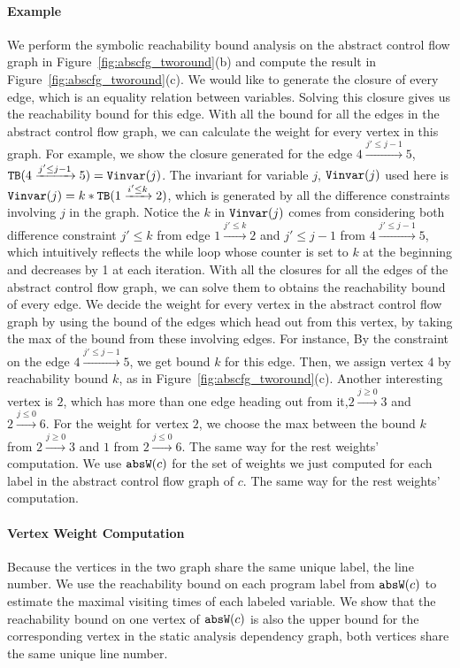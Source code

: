 \begin{enumerate}
\paragraph*{Example}
We perform the symbolic reachability bound analysis on the abstract control flow graph in Figure~\ref{fig:abscfg_tworound}(b) and compute the result in Figure~\ref{fig:abscfg_tworound}(c).
We would like to generate the closure of every edge, which is an equality relation between variables.  Solving this closure gives us the reachability bound for this edge. With all the bound for all the edges in the abstract control flow graph, we can calculate the weight for every vertex in this graph. For example, we show the closure generated for the edge 
$4 \xrightarrow{j' \leq j - 1} 5$, 
${\mathtt{TB}}(4 \xrightarrow{j' \leq j - 1} 5) = {\mathtt{Vinvar}}(j)$. The invariant for variable $j$, ${\mathtt{Vinvar}}(j)$ used here is 
${\mathtt{Vinvar}}(j) = k * {\mathtt{TB}}(1 \xrightarrow{i' \leq k} 2)$, 
which is generated by all the difference constraints involving $j$ in the graph.
Notice the $k$ in ${\mathtt{Vinvar}}(j)$ comes from considering both difference constraint $j' \leq k$ from edge
$1 \xrightarrow{j' \leq k} 2$ and $j'\leq j - 1$ from $4 \xrightarrow{j' \leq j - 1} 5$, which intuitively reflects the while loop whose counter is set to $k$ at the beginning and decreases by 1 at each iteration. 
With all the closures for all the edges of the abstract control flow graph, we can solve them to obtains the reachability bound of every edge. We decide the weight for every vertex in the abstract control flow graph by using the bound of the edges which head out from this vertex, by taking the max of the bound from these involving edges. For instance,   
By the constraint on the edge $4 \xrightarrow{j' \leq j - 1} 5$, we get bound $k$ for this edge.
Then, we assign vertex $4$ by reachability bound $k$, as in Figure~\ref{fig:abscfg_tworound}(c). 
Another interesting vertex is $2$, which has more than one edge heading out from it,$2 \xrightarrow{j \geq 0} 3$ and 
$2 \xrightarrow{j \leq 0} 6$. For the weight for vertex $2$, 
we choose the max between the bound $k$ from $2 \xrightarrow{j \geq 0} 3$ and $1$ from $2 \xrightarrow{j \leq 0} 6$.
The same way for the rest weights' computation.
We use $\mathtt{abs}{\mathtt{W}}(c)$ for the set of weights we just computed 
for each label in the abstract control flow graph of $c$.
%
The same way for the rest weights' computation.
\end{enumerate}

\paragraph{Vertex Weight Computation}
Because
the vertices in the two graph share the same unique label, the line number.
We use the reachability bound on each program label from $\mathtt{abs}{\mathtt{W}}(c)$ to estimate the maximal visiting times of each labeled variable.
We show that the reachability bound on one vertex of $\mathtt{abs}{\mathtt{W}}(c)$ is also the upper bound for the corresponding vertex in the static analysis dependency graph, both vertices share the same unique line number.

